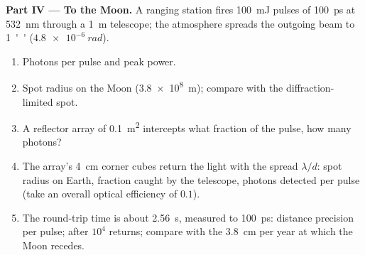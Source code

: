 \begin{problem}
\textbf{Part IV --- To the Moon.}
A ranging station fires \qty{100}{mJ} pulses of \qty{100}{ps} at
\qty{532}{nm} through a \qty{1}{m} telescope; the atmosphere spreads
the outgoing beam to \qty{1}{''} ($\qty{4.8e-6}{rad}$).
\begin{enumerate}[resume]
  \item Photons per pulse and peak power.
  \item Spot radius on the Moon (\qty{3.8e8}{m}); compare with the
        diffraction-limited spot.
  \item A reflector array of \qty{0.1}{m^2} intercepts what fraction of
        the pulse, how many photons?
  \item The array's \qty{4}{cm} corner cubes return the light with the
        spread $\lambda/d$: spot radius on Earth, fraction caught by the
        telescope, photons detected per pulse (take an overall optical
        efficiency of $0.1$).
  \item The round-trip time is about \qty{2.56}{s}, measured to
        \qty{100}{ps}: distance precision per pulse; after $10^4$
        returns; compare with the \qty{3.8}{cm} per year at which the
        Moon recedes.
\end{enumerate}
\end{problem}
